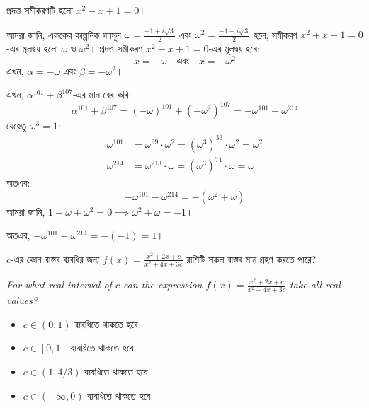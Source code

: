\documentclass[12pt, a4paper]{article}
\begin{document}
\begin{tcolorbox}[solutionbox={সমাধান (Solution)}]
    \noindent
    প্রদত্ত সমীকরণটি হলো $x^2 - x + 1 = 0$। 
    
    আমরা জানি, এককের কাল্পনিক ঘনমূল $\omega = \frac{-1+i\sqrt{3}}{2}$ এবং $\omega^2 = \frac{-1-i\sqrt{3}}{2}$ হলে, সমীকরণ $x^2 + x + 1 = 0$-এর মূলদ্বয় হলো $\omega$ ও $\omega^2$। প্রদত্ত সমীকরণ $x^2 - x + 1 = 0$-এর মূলদ্বয় হবে:
    \[ x = -\omega \quad \text{এবং} \quad x = -\omega^2 \]
    এখন, $\alpha = -\omega$ এবং $\beta = -\omega^2$। 
    
    এখন, $\alpha^{101} + \beta^{107}$-এর মান বের করি:
    \[ \alpha^{101} + \beta^{107} = (-\omega)^{101} + (-\omega^2)^{107} = -\omega^{101} - \omega^{214} \]
    যেহেতু $\omega^3 = 1$:
    \begin{align*}
        \omega^{101} &= \omega^{99} \cdot \omega^2 = (\omega^3)^{33} \cdot \omega^2 = \omega^2 \\
        \omega^{214} &= \omega^{213} \cdot \omega = (\omega^3)^{71} \cdot \omega = \omega
    \end{align*}
    অতএব:
    \[ -\omega^{101} - \omega^{214} = -(\omega^2 + \omega) \]
    আমরা জানি, $1 + \omega + \omega^2 = 0 \implies \omega^2 + \omega = -1$। 
    
    অতএব, $-\omega^{101} - \omega^{214} = -(-1) = 1$।
\end{tcolorbox}
\begin{tcolorbox}[questionbox={প্রশ্ন (Question) 29}]
    \noindent
    $c$-এর কোন বাস্তব ব্যবধির জন্য $f(x) = \frac{x^2 + 2x + c}{x^2 + 4x + 3c}$ রাশিটি সকল বাস্তব মান গ্রহণ করতে পারে?
    
    \vspace{0.8em}
    \begin{english}
    \noindent\textit{\color{darkgray}
    For what real interval of $c$ can the expression $f(x) = \frac{x^2 + 2x + c}{x^2 + 4x + 3c}$ take all real values?
    }
    \end{english}
\end{tcolorbox}

\begin{itemize}[label={}, leftmargin=1cm, itemsep=0.5em]
    \item[\textbf{A)}] $c \in (0, 1)$ ব্যবধিতে থাকতে হবে
    \item[\textbf{B)}] $c \in [0, 1]$ ব্যবধিতে থাকতে হবে
    \item[\textbf{C)}] $c \in (1, 4/3)$ ব্যবধিতে থাকতে হবে
    \item[\textbf{D)}] $c \in (-\infty, 0)$ ব্যবধিতে থাকতে হবে
\end{itemize}
\end{document}

